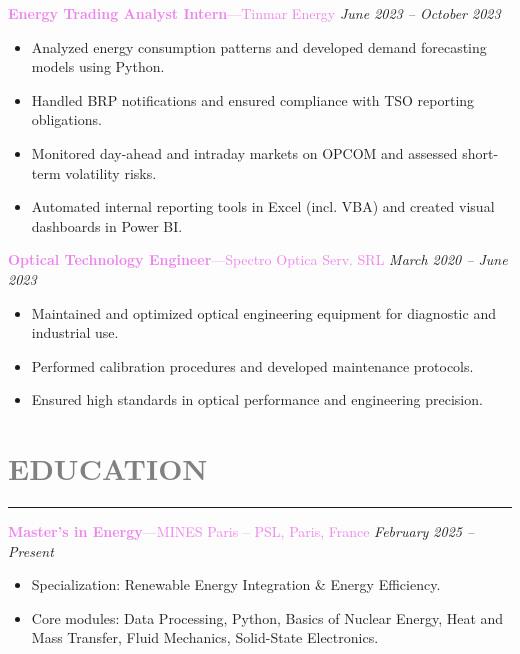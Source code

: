 \documentclass[10pt,a4paper]{article}
\newcommand{\myrule}{\noindent\rule{\linewidth}{0.4pt}}
\begin{document}
\textcolor{violet}{\textbf{Energy Trading Analyst Intern}---Tinmar Energy} \hfill \textit{June 2023 – October 2023} \\[-2.0ex]
\begin{itemize}
    \item Analyzed energy consumption patterns and developed demand forecasting models using Python.
    \item Handled BRP notifications and ensured compliance with TSO reporting obligations.
    \item Monitored day-ahead and intraday markets on OPCOM and assessed short-term volatility risks.
    \item Automated internal reporting tools in Excel (incl. VBA) and created visual dashboards in Power BI.
\end{itemize}

\vspace{0.3cm}

\textcolor{violet}{\textbf{Optical Technology Engineer}---Spectro Optica Serv. SRL} \hfill \textit{March 2020 – June 2023} \\[-2.0ex]
\begin{itemize}
    \item Maintained and optimized optical engineering equipment for diagnostic and industrial use.
    \item Performed calibration procedures and developed maintenance protocols.
    \item Ensured high standards in optical performance and engineering precision.
\end{itemize}

\section*{\textcolor{gray}{EDUCATION}}
\myrule

\textcolor{violet}{\textbf{Master's in Energy}---MINES Paris – PSL, Paris, France} \hfill \textit{February  2025 – Present} \\[-3.0ex]
\vspace{0.5ex}
\begin{itemize}
  \item Specialization: Renewable Energy Integration \& Energy Efficiency.
  \item Core modules: Data Processing, Python, Basics of Nuclear Energy, Heat and Mass Transfer, Fluid Mechanics, Solid-State Electronics.
\end{itemize}
\end{document}
